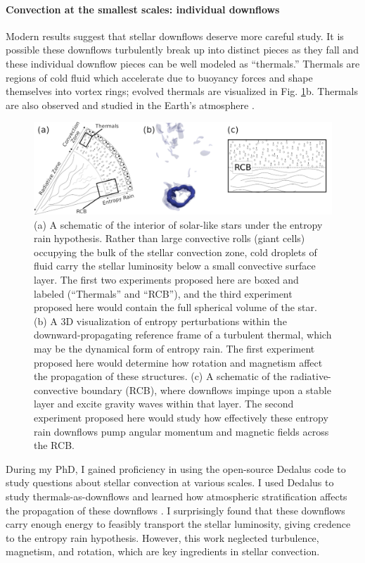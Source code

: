 \documentclass[preprint, hmargin=1in, vmargin=1in]{aastex62}
\begin{document}
\paragraph{Convection at the smallest scales: individual downflows} 
Modern results suggest that stellar downflows deserve more careful study.
It is possible these downflows turbulently break up into distinct pieces as they fall and these individual downflow pieces can be well modeled as ``thermals.''
Thermals are regions of cold fluid which accelerate due to buoyancy forces and shape themselves into vortex rings; evolved thermals are visualized in Fig. \ref{fig:tri_panel}b.
Thermals are also observed and studied in the Earth's atmosphere \citep{lecoanet&jeevanjee2019}.

\begin{figure}[t]
    \includegraphics[width=\textwidth]{./figs/tri_panel.png}
    \caption{ (a) A schematic of the interior of solar-like stars under the entropy rain hypothesis.
	Rather than large convective rolls (giant cells) occupying the bulk of the stellar convection zone, cold droplets of fluid carry the stellar luminosity below a small convective surface layer.
	The first two experiments proposed here are boxed and labeled (``Thermals'' and ``RCB''), and the third experiment proposed here would contain the full spherical volume of the star.
	(b) A 3D visualization of entropy perturbations within the downward-propagating reference frame of a turbulent thermal, which may be the dynamical form of entropy rain.
	The first experiment proposed here would determine how rotation and magnetism affect the propagation of these structures.
	(c) A schematic of the radiative-convective boundary (RCB), where downflows impinge upon a stable layer and excite gravity waves within that layer.
	The second experiment proposed here would study how effectively these entropy rain downflows pump angular momentum and magnetic fields across the RCB.
	\label{fig:tri_panel} }
\end{figure}


During my PhD, I gained proficiency in using the open-source Dedalus \citep{burns&all2019} code to study questions about stellar convection at various scales.
I used Dedalus to study thermals-as-downflows and learned how atmospheric stratification affects the propagation of these downflows \citep{andersLB2019}.
I surprisingly found that these downflows carry enough energy to feasibly transport the stellar luminosity, giving credence to the entropy rain hypothesis.
However, this work neglected turbulence, magnetism, and rotation, which are key ingredients in stellar convection.
\end{document}
